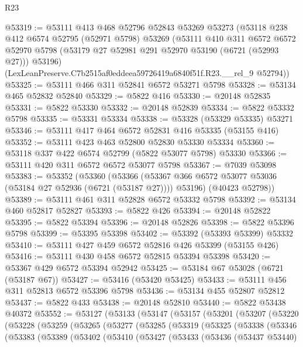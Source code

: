 \begin{lexlean}{R23}
\begin{coremodule}
@53319 := @53111
    @413
    @468
    @52796
    @52843
    @53269
    @53273
    (@53118
      @238
      @412
      @6574
      @52795
      (@52971 @5798)
      @53269
      (@53111
        @410
        @311
        @6572
        @6572
        @52970
        @5798
        (@53179 @27 @52981 @291 @52970 @53190 (@6721 (@52993 @27)))
        @53196)
      (LexLeanPreserve.C7b2515af0eddeea59726419a6840f51f.R23.__rel_9 @52794))
@53325 := @53111 @466 @311 @52841 @6572 @53271 @5798
@53328 := @53134 @465 @52832 @52840
@53329 := @5822 @416
@53330 := @20148 @52835
@53331 := @5822 @53330
@53332 := @20148 @52839
@53334 := @5822 @53332 @5798
@53335 := @53331 @53334
@53338 := @53328 (@53329 @53335) @53271
@53346 := @53111 @417 @464 @6572 @52831 @416 @53335 (@53155 @416)
@53352 := @53111 @423 @463 @52800 @52830 @53330 @53334
@53360 := @53118 @337 @422 @6574 @52799 (@5822 @53077 @5798) @53330
@53366 := @53111 @420 @311 @6572 @6572 @53077 @5798
@53367 := @7039 @53098
@53383 := @53352
    (@53360
      (@53366 (@53367 @366 @6572 @53077 @53036 (@53184 @27 @52936 (@6721 (@53187 @27)))) @53196)
      (@40423 @52798))
@53389 := @53111 @461 @311 @52828 @6572 @53332 @5798
@53392 := @53134 @460 @52817 @52827
@53393 := @5822 @426
@53394 := @20148 @52822
@53395 := @5822 @53394
@53396 := @20148 @52826
@53398 := @5822 @53396 @5798
@53399 := @53395 @53398
@53402 := @53392 (@53393 @53399) @53332
@53410 := @53111 @427 @459 @6572 @52816 @426 @53399 (@53155 @426)
@53416 := @53111 @430 @458 @6572 @52815 @53394 @53398
@53420 := @53367 @429 @6572 @53394 @52942
@53425 := @53184 @67 @53028 (@6721 (@53187 @67))
@53427 := @53416 (@53420 @53425)
@53433 := @53111 @456 @311 @52813 @6572 @53396 @5798
@53436 := @53134 @455 @52807 @52812
@53437 := @5822 @433
@53438 := @20148 @52810
@53440 := @5822 @53438 @40372
@53552 := @53127
    (@53133
      (@53147
        (@53157
          (@53201
            (@53207
              (@53220
                (@53228
                  (@53259
                    (@53265
                      (@53277
                        (@53285
                          (@53319
                            (@53325
                              (@53338
                                (@53346
                                  (@53383
                                    (@53389
                                      (@53402
                                        (@53410
                                          (@53427
                                            (@53433
                                              (@53436
                                                (@53437 @53440)

\end{coremodule}
\end{lexlean}
